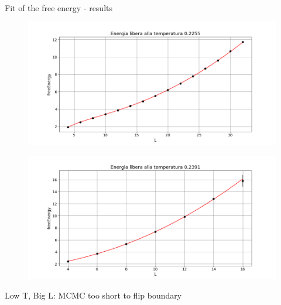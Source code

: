 \documentclass[12pt,handout]{beamer}
\begin{document}
\begin{frame}{Fit of the free energy - results}
\begin{figure}[!htb]
\centering
\includegraphics[scale=0.4]{02255FvsL.png}
\end{figure}
\end{frame}

\begin{frame}
\begin{figure}[!htb]
\centering
\includegraphics[scale=0.4]{02391FvsL.png}
\end{figure}
Low T, Big L: MCMC too short to flip boundary
\end{frame}
\end{document}
